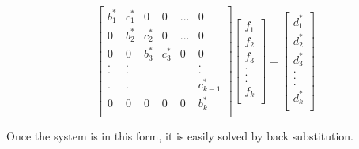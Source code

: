 \documentclass[12pt, oneside]{book}
\theoremstyle{plain}
\theoremstyle{definition}
\begin{document}
$$
\begin{bmatrix}  
b^{*}_1 & c^{*}_1 & 0 & 0 & ... & 0 \\ 
0 & b^{*}_2 & c^{*}_2 & 0  & ...  & 0\\ 
0 & 0 & b^{*}_3 & c^{*}_3 & 0 & 0  \\ 
. & . &  &  &  & . \\ 
. & . &  &  &  & . \\ 
. & . &  &  &  & c^{*}_{k-1} \\ 
0 & 0 & 0 & 0 & 0 & b^{*}_k \\ 
\end{bmatrix} \begin{bmatrix}  
f_1 \\ 
f_2 \\ 
f_3 \\ 
.\\ 
.\\ 
.\\ 
f_k \\ 
\end{bmatrix} = \begin{bmatrix} 
d^{*}_1 \\ 
d^{*}_2 \\ 
d^{*}_3 \\ 
.\\ 
.\\ 
.\\ 
d^{*}_k \\ 
\end{bmatrix}
$$

Once the system is in this form, it is easily solved by back substitution.
 
\end{document}
